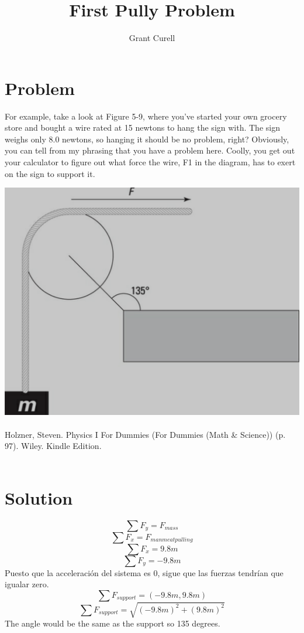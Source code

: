\documentclass{article}
\title{First Pully Problem}
\author{Grant Curell}
\begin{document}
\maketitle{}
\section{Problem}
For example, take a look at Figure 5-9, where you’ve started your own grocery store and bought a wire rated at 15 newtons to hang the sign with. The sign weighs only 8.0 newtons, so hanging it should be no problem, right? Obviously, you can tell from my phrasing that you have a problem here. Coolly, you get out your calculator to figure out what force the wire, F1 in the diagram, has to exert on the sign to support it.

\includegraphics[width=\columnwidth]{image}
\\\\
Holzner, Steven. Physics I For Dummies (For Dummies (Math \& Science)) (p. 97). Wiley. Kindle Edition.
\\\\
\section{Solution}
\[ \sum F_y=F_{mass} \]
\[ \sum F_x=F_{manmeat pulling} \]
\[ \sum F_x=9.8m \]
\[ \sum F_y=-9.8m \]
Puesto que la acceleración del sistema es 0, sigue que las fuerzas tendrían
que igualar zero.
\[ \sum F_{support}=(-9.8m,9.8m) \]
\[ \sum F_{support}=\sqrt{(-9.8m)^2+(9.8m)^2} \]
The angle would be the same as the support so 135 degrees.
\end{document}
